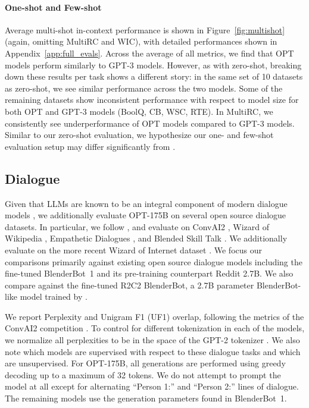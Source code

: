 \paragraph{One-shot and Few-shot} Average multi-shot in-context performance is shown in Figure~\ref{fig:multishot} (again, omitting MultiRC and WIC), with detailed performances shown in Appendix~\ref{app:full_evals}. Across the average of all metrics, we find that OPT models perform similarly to GPT-3 models. However, as with zero-shot, breaking down these results per task shows a different story: in the same set of 10 datasets as zero-shot, we see similar performance across the two models. Some of the remaining datasets show inconsistent performance with respect to model size for both OPT and GPT-3 models (BoolQ, CB, WSC, RTE). In MultiRC, we consistently see underperformance of OPT models compared to GPT-3 models. Similar to our zero-shot evaluation, we hypothesize our one- and few-shot evaluation setup may differ significantly from \citet{brown2020gpt3}.

\subsection{Dialogue}
\label{sec:dialogue}

Given that LLMs are known to be an integral component of modern dialogue models \cite{adiwardana2020meena,roller-etal-2021-recipes,thoppilan2022lamda,gopher2022,palm2022}, we additionally evaluate {OPT-175B} on several open source dialogue datasets. In particular, we follow \citet{roller-etal-2021-recipes}, and evaluate on ConvAI2 \cite{dinan2019second}, Wizard of Wikipedia \cite{dinan2018wizard}, Empathetic Dialogues \cite{rashkin2019empathetic}, and Blended Skill Talk \cite{smith2020bst}. We additionally evaluate on the more recent Wizard of Internet dataset \cite{komeili2021woi}. We focus our comparisons primarily against existing open source dialogue models including the fine-tuned BlenderBot~1 \cite{roller-etal-2021-recipes} and its pre-training counterpart Reddit 2.7B. We also compare against the fine-tuned R2C2 BlenderBot, a 2.7B parameter BlenderBot-like model trained by \citet{shuster2022language}.

We report Perplexity and Unigram F1 (UF1) overlap, following the metrics of the ConvAI2 competition \cite{dinan2019second}. To control for different tokenization in each of the models, we normalize all perplexities to be in the space of the GPT-2 tokenizer \cite{radford2019language}. We also note which models are supervised with respect to these dialogue tasks and which are unsupervised. For {OPT-175B}, all generations are performed using greedy decoding up to a maximum of 32 tokens. We do not attempt to prompt the model at all except for alternating ``Person 1:'' and ``Person 2:'' lines of dialogue. The remaining models use the generation parameters found in BlenderBot~1.

